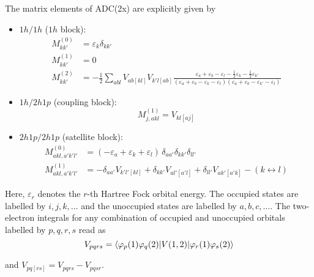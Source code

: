 The matrix elements of ADC(2x) are explicitly given by
\begin{itemize}
 \item $1h/1h$ ($1h$ block):
   \begin{align}
    M_{kk'}^{(0)} &= \varepsilon_k \delta_{kk'} \\
    M_{kk'}^{(1)} &= 0 \\
    M_{kk'}^{(2)} &= -\frac12 \sum\limits_{abl} V_{ab[kl]} V_{k'l[ab]} %
                     \frac{\varepsilon_a+\varepsilon_b-\varepsilon_l
                       -\frac12 \varepsilon_k-\frac12 \varepsilon_{k'}}
                     {(\varepsilon_a+\varepsilon_b-\varepsilon_k-\varepsilon_l)
                      (\varepsilon_a+\varepsilon_b-\varepsilon_{k'}-\varepsilon_l)}
   \end{align}
 \item $1h/2h1p$ (coupling block):
   \begin{equation}
    M_{j,akl}^{(1)} = V_{kl[aj]}
   \end{equation}
 \item $2h1p/2h1p$ (satellite block):
   \begin{align}
    M_{akl,a'k'l'}^{(0)} &= (-\varepsilon_a+\varepsilon_k+\varepsilon_l)
                             \, \delta_{aa'}\delta_{kk'}\delta_{ll'} \\
    M_{akl,a'k'l'}^{(1)} &= -\delta_{aa'} V_{k'l'[kl]} + \delta_{kk'} V_{al'[a'l]}
                            +\delta_{ll'} V_{ak'[a'k]} - (k \leftrightarrow l)
   \end{align}
\end{itemize}

Here, $\varepsilon_r$ denotes the $r$-th Hartree Fock orbital energy.
The occupied states are labelled
by $i,j,k,\dots$ and the unoccupied states are labelled by $a,b,c,\dots$. The
two-electron integrals for any combination of occupied and unoccupied orbitals
labelled by $p,q,r,s$ read as
\begin{equation}
 V_{pqrs} = \braket{\varphi_p(1)\varphi_q(2) |V(1,2)| \varphi_r(1)\varphi_s(2)}
\end{equation}

and $V_{pq[rs]} = V_{pqrs} - V_{pqsr}$.

